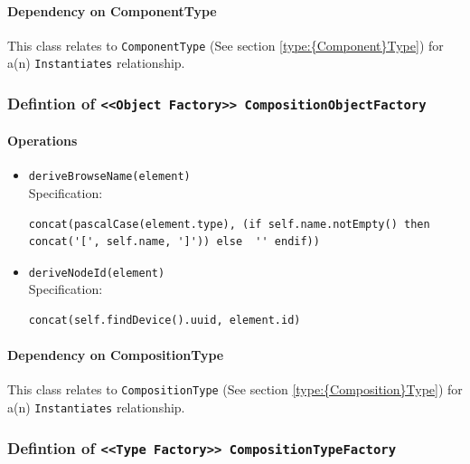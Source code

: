 \paragraph{Dependency on {Component}Type}

This class relates to \texttt{{Component}Type} (See section \ref{type:{Component}Type}) for a(n) \texttt{Instantiates} relationship.

\FloatBarrier
\subsubsection{Defintion of \texttt{<<Object Factory>> CompositionObjectFactory}} \label{type:CompositionObjectFactory}

\FloatBarrier



\paragraph{Operations}
\begin{itemize}
  \item \texttt{deriveBrowseName(element)}\\
    Specification:
   \indent \begin{lstlisting}
concat(pascalCase(element.type), (if self.name.notEmpty() then concat('[', self.name, ']')) else  '' endif))
\end{lstlisting}

  \item \texttt{deriveNodeId(element)}\\
    Specification:
   \indent \begin{lstlisting}
concat(self.findDevice().uuid, element.id)
\end{lstlisting}

\end{itemize}
\paragraph{Dependency on {Composition}Type}

This class relates to \texttt{{Composition}Type} (See section \ref{type:{Composition}Type}) for a(n) \texttt{Instantiates} relationship.

\FloatBarrier
\subsubsection{Defintion of \texttt{<<Type Factory>> CompositionTypeFactory}} \label{type:CompositionTypeFactory}

